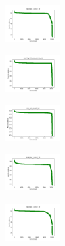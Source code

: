 \begin{figure}[H]
    \hfill
    \begin{subfigure}
        \centering
        \includegraphics[width=0.234\textwidth]{img/HS-LS-v2/rand_set_const_10_277451237_cost.png}
    \end{subfigure}
    \hfill
    \begin{subfigure}
        \centering
        \includegraphics[width=0.234\textwidth]{img/HS-LS-v2/newthyroid_set_const_10_277451237_cost.png}
    \end{subfigure}
    \hfill
    \begin{subfigure}
        \centering
        \includegraphics[width=0.234\textwidth]{img/HS-LS-v2/iris_set_const_10_49258669_cost.png}
    \end{subfigure}
    \hfill
    \begin{subfigure}
        \centering
        \includegraphics[width=0.234\textwidth]{img/HS-LS-v2/ecoli_set_const_10_49258669_cost.png}
    \end{subfigure}
    \hfill
    \begin{subfigure}
        \centering
        \includegraphics[width=0.234\textwidth]{img/HS-LS-v2/rand_set_const_10_49258669_cost.png}
    \end{subfigure}
    \hfill
    \begin{subfigure}

\end{subfigure}
\end{figure}
